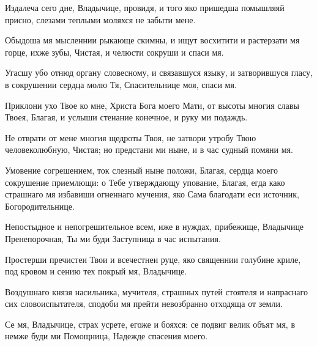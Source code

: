 \begin{mymulticols}

Издалеча сего дне, Владычице, провидя, и того яко пришедша помышляяй присно, слезами теплыми моляхся не забыти мене.


Обыдоша мя мысленнии рыкающе скимны, и ищут восхитити и растерзати мя горце, ихже зубы, Чистая, и челюсти сокруши и спаси мя.


Угасшу убо отнюд органу словесному, и связавшуся языку, и затворившуся гласу, в сокрушении сердца молю Тя, Спасительнице моя, спаси мя.

\slava

Приклони ухо Твое ко мне, Христа Бога моего Мати, от высоты многия славы Твоея, Благая, и услыши стенание конечное, и руку ми подаждь.

\inyne

 Не отврати от мене многия щедроты Твоя, не затвори утробу Твою человеколюбную, Чистая; но предстани ми ныне, и в час судный помяни мя.




Умовение согрешением, ток слезный ныне положи, Благая, сердца моего сокрушение приемлющи: о Тебе утверждающу упование, Благая, егда како страшнаго мя избавиши огненнаго мучения, яко Сама благодати еси источник, Богородительнице.


Непостыдное и непогрешительное всем, иже в нуждах, прибежище, Владычице Пренепорочная, Ты ми буди Заступница в час испытания.


Простерши пречистеи Твои и всечестнеи руце, яко священнии голубине криле, под кровом и сению тех покрый мя, Владычице.

\slava

Воздушнаго князя насильника, мучителя, страшных путей стоятеля и напраснаго сих словоиспытателя, сподоби мя прейти невозбранно отходяща от земли.

\inyne

 Се мя, Владычице, страх усрете, егоже и бояхся: се подвиг велик объят мя, в немже буди ми Помощница, Надежде спасения моего.


\end{mymulticols}
